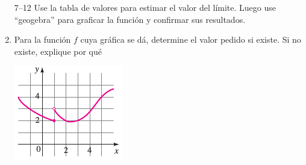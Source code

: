 \documentclass[10pt,twoside]{article}
\begin{document}
\begin{enumerate}
7--12 Use la tabla de valores para estimar el valor del límite. Luego use ``geogebra'' para graficar la función y confirmar sus resultados.
\item Para la función $f$ cuya gráfica se dá, determine el valor pedido si existe. Si no existe, explique por qué
\begin{enumerate}
\begin{minipage}{.65\textwidth}
\end{minipage}
\begin{minipage}{.35\textwidth}
 \includegraphics{./Images/funcionPto13.png}
\end{minipage}


 
 

\end{enumerate}

\end{enumerate}
\end{document}

